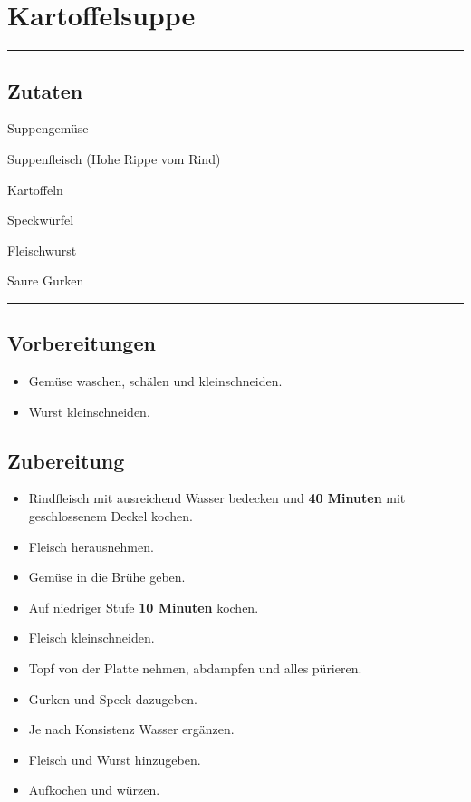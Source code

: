 \section*{Kartoffelsuppe}

\bigbreak
\rule{\textwidth}{0.4pt}


\subsection*{Zutaten}

\begin{description}[align=right,leftmargin=!,labelwidth=\widthof{\bfseries xxPrisen}]
    \item[1 Pkg] Suppengemüse
    \item[500g] Suppenfleisch (Hohe Rippe vom Rind)
    \item[800g] Kartoffeln
    \item[200g] Speckwürfel
    \item[1] Fleischwurst
    \item[*] Saure Gurken
\end{description}


\rule{\textwidth}{0.4pt}


\subsection*{Vorbereitungen}

\begin{itemize}
    \item Gemüse waschen, schälen und kleinschneiden.
    \item Wurst kleinschneiden.
\end{itemize}


\bigbreak
\subsection*{Zubereitung}

    \begin{itemize}
        \item Rindfleisch mit ausreichend Wasser bedecken und \textbf{40 Minuten} mit geschlossenem Deckel kochen.
        \item Fleisch herausnehmen.
        \item Gemüse in die Brühe geben.
        \item Auf niedriger Stufe \textbf{10 Minuten} kochen.
        \item Fleisch kleinschneiden.
        \item Topf von der Platte nehmen, abdampfen und alles pürieren.
        \item Gurken und Speck dazugeben.
        \item Je nach Konsistenz Wasser ergänzen.
        \item Fleisch und Wurst hinzugeben.
        \item Aufkochen und würzen.
    \end{itemize}

